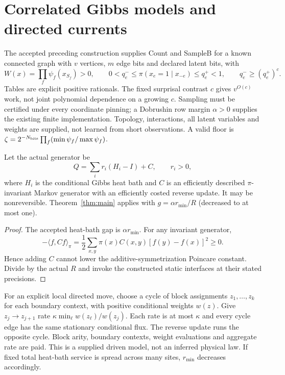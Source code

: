 \section{Correlated Gibbs models and directed currents}
The accepted preceding construction supplies Count and SampleB for a known connected graph with $v$ vertices, $m$ edge bits and declared latent bits, with
\[
W(x)=\prod_f\psi_f(x_{S_f})>0,\qquad
0<q_e^-\le\pi(x_e=1\mid x_{-e})\le q_e^+<1,\qquad
q_e^-\ge(q_e^+)^c.
\]
Tables are explicit positive rationals. The fixed surprisal contrast $c$ gives $v^{O(c)}$ work, not joint polynomial dependence on a growing $c$. Sampling must be certified under every coordinate pinning; a Dobrushin row margin $\alpha>0$ supplies the existing finite implementation. Topology, interactions, all latent variables and weights are supplied, not learned from short observations. A valid floor is
$\zeta=2^{-N_{\rm bits}}\prod_f(\min\psi_f/\max\psi_f)$.

\begin{corollary}
Let the actual generator be
\[
Q=\sum_i r_i(H_i-I)+C,\qquad r_i>0,
\]
where $H_i$ is the conditional Gibbs heat bath and $C$ is an efficiently described $\pi$-invariant Markov generator with an efficiently costed reverse update. It may be nonreversible. Theorem~\ref{thm:main} applies with $g=\alpha r_{\min}/R$ (decreased to at most one).
\end{corollary}
\begin{proof}
The accepted heat-bath gap is $\alpha r_{\min}$. For any invariant generator,
\[
-\langle f,Cf\rangle_\pi
=\frac12\sum_{x,y}\pi(x)C(x,y)[f(y)-f(x)]^2\ge0.
\]
Hence adding $C$ cannot lower the additive-symmetrization Poincare constant. Divide by the actual $R$ and invoke the constructed static interfaces at their stated precisions.
\end{proof}

For an explicit local directed move, choose a cycle of block assignments $z_1,\ldots,z_k$ for each boundary context, with positive conditional weights $w(z)$. Give $z_j\to z_{j+1}$ rate
$\kappa\min_\ell w(z_\ell)/w(z_j)$.
Each rate is at most $\kappa$ and every cycle edge has the same stationary conditional flux. The reverse update runs the opposite cycle. Block arity, boundary contexts, weight evaluations and aggregate rate are paid. This is a supplied driven model, not an inferred physical law. If fixed total heat-bath service is spread across many sites, $r_{\min}$ decreases accordingly.

